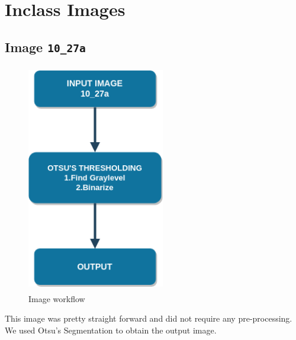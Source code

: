 \section{Inclass Images}
\subsection{Image \texttt{10\_27a}}
\begin{figure}[h!]
  \centering
  \includegraphics[width=6cm,height=10cm,keepaspectratio]{img/image_10_27a_flow.png}
  \caption{Image  workflow}
\end{figure}

This image was pretty straight forward and did not require any pre-processing. We used Otsu’s Segmentation to obtain the output image.

\pagebreak

